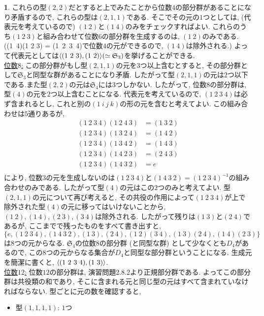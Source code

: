 \documentclass{article}
\theoremstyle{definition}
\newtheorem{ans}{}
\numberwithin{ans}{subsection}
\DeclarePairedDelimiter{\gen}{\langle}{\rangle}
\begin{document}
\begin{ans}
  これらの型$(2, 2)$だとすると上でみたことから位数$4$の部分群があることになり矛盾するので, これらの型は$(2, 1, 1)$である.
  そこでその元の$1$つとしては, (代表元を考えているので) $(1\ 2)$と$(1\ 4)$のみをチェックすればよい.
  これらのうち$(1\ 2\ 3)$と組み合わせて位数$6$の部分群を生成するのは, $(1\ 2)$のみである.
  ((1\ 4)(1 2 3) = (1\ 2\ 3\ 4)で位数$4$の元ができるので, $(1\ 4)$は除外される.)
  よって代表元としては$\gen{(1\ 2\ 3), (1\ 2)} (\simeq \mathfrak{S}_3)$を挙げることができる.\\
  \underline{位数$8$:}
  この部分群がもし型$(2, 1, 1)$の元を3つ以上含むとすると, その部分群として$\mathfrak{S}_3$と同型な群があることになり矛盾.
  したがって型$(2, 1, 1)$の元は$2$つ以下である.また型$(2, 2)$の元は$\mathfrak{S}_4$には3つしかない.
  したがって, 位数$8$の部分群は, 型$(4)$の元を$2$つ以上含むことになる.
  代表元を考えているので, $(1\ 2\ 3\ 4)$は必ず含まれるとし, これと別の$(1\ i\ j\ k)$の形の元を含むと考えてよい.
  この組み合わせは$5$通りあるが,
  \begin{align*}
    (1\ 2\ 3\ 4)(1\ 2\ 4\ 3) &= (1\ 3\ 2)\\
    (1\ 2\ 3\ 4)(1\ 3\ 2\ 4) &= (1\ 4\ 2)\\
    (1\ 2\ 3\ 4)(1\ 3\ 4\ 2) &= (1\ 4\ 3)\\
    (1\ 2\ 3\ 4)(1\ 4\ 2\ 3) &= (2\ 4\ 3)\\
    (1\ 2\ 3\ 4)(1\ 4\ 3\ 2) &= e\\
  \end{align*}
  により, 位数$3$の元を生成しないのは$(1\ 2\ 3\ 4)$と$(1\ 4\ 3\ 2) = (1\ 2\ 3\ 4)^{-1}$の組み合わせのみである.
  したがって型$(4)$の元はこの$2$つのみと考えてよい.
  型$(2, 1, 1)$の元について再び考えると, その共役の作用によって$(1\ 2\ 3\ 4)$が上で除外された型$(4)$の元に移ってはいけないことから,
  $(1\ 2), (1\ 4), (2\ 3), (3\ 4)$は除外される. したがって残りは$(1\ 3)$と$(2\ 4)$であるが,
  ここまでで残ったものをすべて書き出すと,
  $\{e, (1\ 2\ 3\ 4), (1\ 4\ 3\ 2), (1\ 3), (2\ 4), (1\ 2)(3\ 4), (1\ 3)(2\ 4), (1\ 4)(2\ 3) \}$
  は$8$つの元からなる. $\mathfrak{S_4}$の位数$8$の部分群 (と同型な群) として少なくとも$D_4$があるので,
  この$8$つの元からなる集合が$D_4$と同型な部分群ということになる.
  生成元を簡潔に書くと, $\gen{(1\ 2\ 3\ 4), (1\ 3)}$.\\
  \underline{位数$12$:}
  位数$12$の部分群は, 演習問題2.8.2より正規部分群である.
  よってこの部分群は共役類の和であり,
  そこに含まれる元と同じ型の元はすべて含まれていなければならない.
  型ごとに元の数を確認すると,
  \begin{itemize}
    \item 型$(1, 1, 1, 1)$: $1$つ

\end{itemize}
\end{ans}
\end{document}
